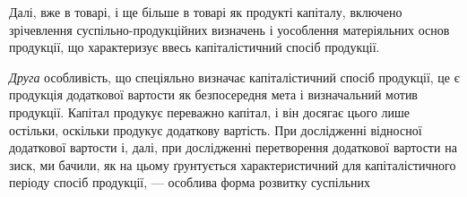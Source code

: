Далі, вже в товарі, і ще більше в товарі як продукті капіталу, включено
зрічевлення суспільно-продукційних визначень і уособлення матеріяльних
основ продукції, що характеризує ввесь капіталістичний спосіб продукції.

\emph{Друга} особливість, що спеціяльно визначає капіталістичний спосіб продукції,
це є продукція додаткової вартости як безпосередня мета і визначальний
мотив продукції. Капітал продукує переважно капітал, і він досягає цього
лише остільки, оскільки продукує додаткову вартість. При дослідженні відносної
додаткової вартости і, далі, при дослідженні перетворення додаткової вартости
на зиск, ми бачили, як на цьому ґрунтується характеристичний для капіталістичного
періоду спосіб продукції, — особлива форма розвитку суспільних
\parbreak{}  %
